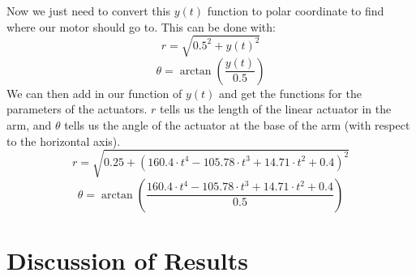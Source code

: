 \documentclass[nofoot,pdf-a,balance,colorlinks,upint,subscriptcorrection,varvw,mathalfa=cal=boondoxo]{asmeconf}
\begin{document}
	Now we just need to convert this $y\left(t\right)$ function to polar coordinate to find where our motor should go to. This can be done with:
	\begin{equation}
	r = \sqrt{0.5^2+y\left(t\right)^2}
	\end{equation}
	\begin{equation}
        \theta = \arctan{\left(\frac{y\left(t\right)}{0.5}\right)}
	\end{equation}
    We can then add in our function of $y\left(t\right)$ and get the functions for the parameters of the actuators. $r$ tells us the length of the linear actuator in the arm, and $\theta$ tells us the angle of the actuator at the base of the arm (with respect to the horizontal axis). 
	\begin{equation}
	r = \sqrt{0.25+\left( 160.4 \cdot t^4 - 105.78 \cdot t^3 + 14.71 \cdot t^2 + 0.4\right)^2}
	\end{equation}
	\begin{equation}
        \theta = \arctan{\left(\frac{160.4 \cdot t^4 - 105.78 \cdot t^3 + 14.71 \cdot t^2 + 0.4}{0.5}\right)}
	\end{equation}

	\section*{Discussion of Results}

	
\end{document}
